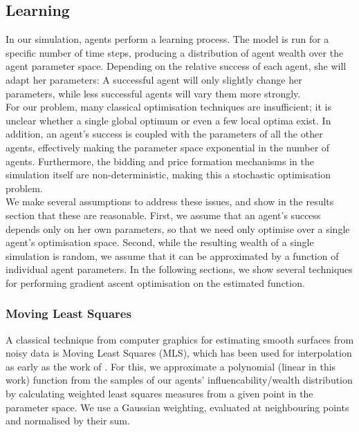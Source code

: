\documentclass[11pt]{article}
\begin{document}
\subsection{Learning}

In our simulation, agents perform a learning process. The model is run for a specific number of time steps, producing a distribution of agent wealth over the agent parameter space. Depending on the relative success of each agent, she will adapt her parameters: A successful agent will only slightly change her parameters, while less successful agents will vary them more strongly. \\
For our problem, many classical optimisation techniques are insufficient; it is unclear whether a single global optimum or even a few local optima exist. In addition, an agent's success is coupled with the parameters of all the other agents, effectively making the parameter space exponential in the number of agents. Furthermore, the bidding and price formation mechanisms in the simulation itself are non-deterministic, making this a stochastic optimisation problem. \\
We make several assumptions to address these issues, and show in the results section that these are reasonable. First, we assume that an agent's success depends only on her own parameters, so that we need only optimise over a single agent's optimisation space. Second, while the resulting wealth of a single simulation is random, we assume that it can be approximated by a function of individual agent parameters. In the following sections, we show several techniques for performing gradient ascent optimisation on the estimated function. \\

\subsubsection{Moving Least Squares}

A classical technique from computer graphics for estimating smooth surfaces from noisy data is Moving Least Squares (MLS), which has been used for interpolation as early as the work of \citet{lancaster1981surfaces}. For this, we approximate a polynomial (linear in this work) function from the samples of our agents' influencability/wealth distribution by calculating weighted least squares measures from a given point in the parameter space. We use a Gaussian weighting, evaluated at neighbouring points and normalised by their sum. \\
\end{document}

